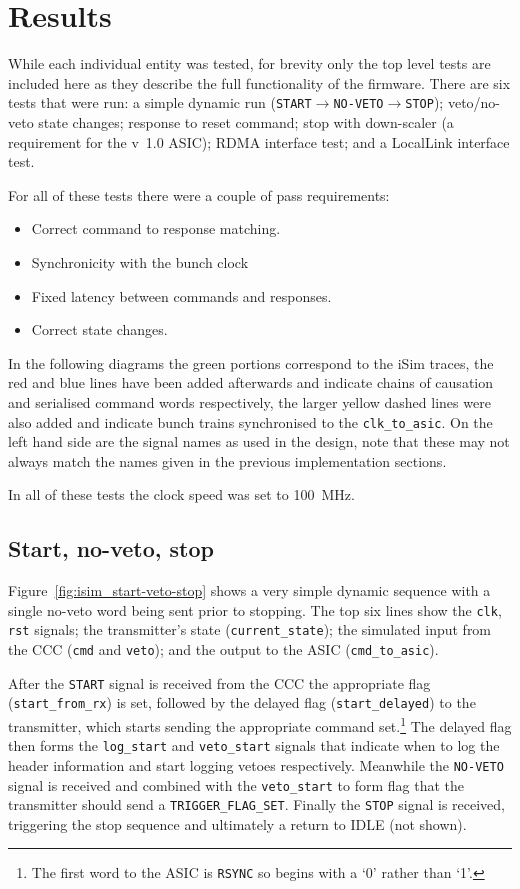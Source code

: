 \section{Results} %
\label{sec:results}
While each individual entity was tested, for brevity only the top level tests are included here as they describe the full functionality of the firmware. There are six tests that were run: a simple dynamic run (\texttt{START}\(\rightarrow\)\texttt{NO-VETO}\(\rightarrow\)\texttt{STOP}); veto/no-veto state changes; response to reset command; stop with down-scaler (a requirement for the v~1.0 ASIC); RDMA interface test; and a LocalLink interface test.

For all of these tests there were a couple of pass requirements:
\begin{itemize}
  \item Correct command to response matching.
  \item Synchronicity with the bunch clock
  \item Fixed latency between commands and responses. 
  \item Correct state changes.
\end{itemize}

In the following diagrams the green portions correspond to the iSim traces, the red and blue lines have been added afterwards and indicate chains of causation and serialised command words respectively, the larger yellow dashed lines were also added and indicate bunch trains synchronised to the \texttt{clk\_to\_asic}. On the left hand side are the signal names as used in the design, note that these may not always match the names given in the previous implementation sections.

In all of these tests the clock speed was set to 100~MHz.

\subsection{Start, no-veto, stop} %
\label{sec:start_no_veto_stop}
Figure~\ref{fig:isim_start-veto-stop} shows a very simple dynamic sequence with a single no-veto word being sent prior to stopping. The top six lines show the \texttt{clk}, \texttt{rst} signals; the transmitter's state (\texttt{current\_state}); the simulated input from the CCC (\texttt{cmd} and \texttt{veto}); and the output to the ASIC (\texttt{cmd\_to\_asic}).

After the \texttt{START} signal is received from the CCC the appropriate flag (\texttt{start\_from\_rx}) is set, followed by the delayed flag (\texttt{start\_delayed}) to the transmitter, which starts sending the appropriate command set.\footnote{The first word to the ASIC is \texttt{RSYNC} so begins with a `0' rather than `1'.} The delayed flag then forms the \texttt{log\_start} and \texttt{veto\_start} signals that indicate when to log the header information and start logging vetoes respectively. Meanwhile the \texttt{NO-VETO} signal is received and combined with the \texttt{veto\_start} to form flag that the transmitter should send a \texttt{TRIGGER\_FLAG\_SET}. Finally the \texttt{STOP} signal is received, triggering the stop sequence and ultimately a return to IDLE (not shown).

